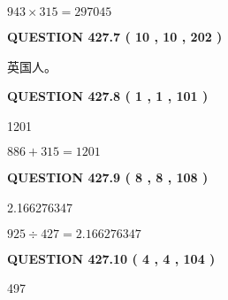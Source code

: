 \documentclass{ctexart}
\begin{document}
$ %
943 \times  %
315=   %
297045$
 
 
  
\vspace{0.2in}
  
{\textbf{\Large{QUESTION
427.7 
 ( 10 , 10 , 202 )
}}}
  
  
 
 
\noindent{}
 
 
英国人。
 
 
 
 
  
\vspace{0.2in}
  
{\textbf{\Large{QUESTION
427.8 
 ( 1 , 1 , 101 )
}}}
  
  
 
 
\noindent{}

1201
 
 
 
 
\noindent{}

$ %
886 +  %
315=   %
1201$
 
 
  
\vspace{0.2in}
  
{\textbf{\Large{QUESTION
427.9 
 ( 8 , 8 , 108 )
}}}
  
  
 
 
\noindent{}

2.166276347
 
 
 
 
\noindent{}

$ %
925 \div  %
427=   %
2.166276347$
 
 
  
\vspace{0.2in}
  
{\textbf{\Large{QUESTION
427.10 
 ( 4 , 4 , 104 )
}}}
  
  
 
 
\noindent{}

497
 
 
 
 
\noindent{}
\end{document}
